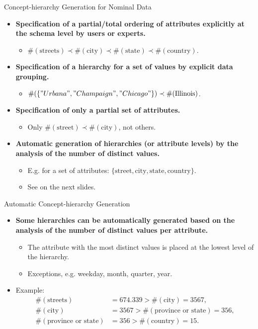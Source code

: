 \begin{frame}{Concept-hierarchy Generation for Nominal Data}
	\begin{itemize}
		\item \textbf{Specification of a partial/total ordering of attributes 
		explicitly at the schema level by users or experts.}
		\begin{itemize}
			\item $\#(\text{streets}) \prec \#(\text{city}) \prec 
			\#(\text{state}) \prec \#(\text{country})$.
		\end{itemize}
		\item \textbf{Specification of a hierarchy for a set of values by 
		explicit data grouping.}
		\begin{itemize}
			\item $\#(\{"Urbana", "Champaign", "Chicago"\}) \prec 
			\#(\text{Illinois})$.
		\end{itemize}
		\item \textbf{Specification of only a partial set of attributes.}
		\begin{itemize}
			\item Only $\#(\text{street}) \prec \#(\text{city})$, not others.
		\end{itemize}
		\item \textbf{Automatic generation of hierarchies (or attribute levels) 
		by the analysis of the number of distinct values.}
		\begin{itemize}
			\item E.g. for a set of attributes: $\{\text{street}, \text{city}, 
			\text{state}, \text{country}\}$.
			\item See on the next slides.
		\end{itemize}
	\end{itemize}
\end{frame}

\begin{frame}{Automatic Concept-hierarchy Generation}
	\begin{itemize}
		\item \textbf{Some hierarchies can be automatically generated based on 
		the analysis of the number of distinct values per attribute.}
		\begin{itemize}
			\item The attribute with the most distinct values is placed at the 
			lowest level of the hierarchy.
			\item Exceptions, e.g. weekday, month, quarter, year.
		\end{itemize}
		\item Example:
		\begin{align}
			\#(\text{streets})           & = 674.339 > \#(\text{city}) =  
			3567,           \\
			\#(\text{city})              & =  3567 > \#(\text{province or 
			state}) =  356, \\
			\#(\text{province or state}) & =  356 > \#(\text{country}) = 
			15.              
		\end{align}
	\end{itemize}
\end{frame}